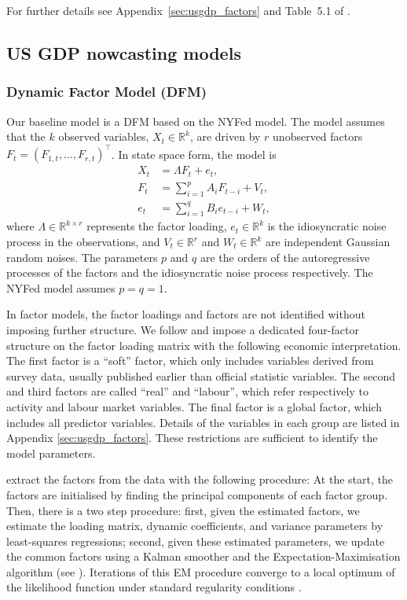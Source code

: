 \documentclass[a4paper, 12pt]{article}
\theoremstyle{remark}
\begin{document}
For further details see Appendix~\ref{sec:usgdp_factors} and Table~5.1 of \cite{bok2018macroeconomic}.

\subsection{US GDP nowcasting models}


\subsubsection*{Dynamic Factor Model (DFM)}

Our baseline model is a DFM based on the NYFed model. The model assumes that the \(k\) observed variables, \(X_t \in \mathbb{R}^k\), are driven by $r$ unobserved factors ${F_t} = (F_{1,t}, \dots, F_{r,t})^\intercal$. In state space form, the model is
\begin{align*}
    X_t &= \Lambda F_t + e_t, \\
    F_t &= \sum_{i = 1}^{p} A_i F_{t-i} + V_t, \\
    e_t &= \sum_{i = 1}^{q} B_i e_{t-i} + W_t,
\end{align*}
where \(\Lambda \in \mathbb{R}^{k \times r}\) represents the factor loading, \(e_t \in \mathbb{R}^k\) is the idiosyncratic noise process in the observations, and \(V_t \in \mathbb{R}^r\) and \(W_t \in \mathbb{R}^k\) are independent Gaussian random noises. The parameters \(p\) and \(q\) are the orders of the autoregressive processes of the factors and the idiosyncratic noise process respectively. The NYFed model assumes  \(p=q=1\).

In factor models, the factor loadings and factors are not identified without imposing further structure. We follow \citet{bok2018macroeconomic} and impose a dedicated four-factor structure on the factor loading matrix with the following economic interpretation. The first factor is a ``soft'' factor, which only includes variables derived from survey data, usually published earlier than official statistic variables. The second and third factors are called ``real'' and ``labour'', which refer respectively to activity and labour market variables. The final factor is a global factor, which includes all predictor variables. Details of the variables in each group are listed in Appendix \ref{sec:usgdp_factors}. These restrictions are sufficient to identify the model parameters.

\citet{bok2018macroeconomic} extract the factors from the data with the following procedure: At the start, the factors are initialised by finding the principal components of each factor group. Then, there is a two step procedure: first, given the estimated factors, we estimate the loading matrix, dynamic coefficients, and variance parameters by least-squares regressions; second, given these estimated parameters, we update the common factors using a Kalman smoother and the Expectation-Maximisation algorithm (see \citet{baum1966statistical, baum1967aninequality, baum1970amaximization}). Iterations of this EM procedure converge to a local optimum of the likelihood function under standard regularity conditions \citep{dempster1977maximum, wu1983on}.
\end{document}
